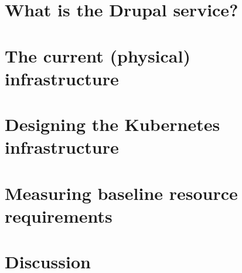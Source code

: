 \documentclass{webofc}
\begin{document}
\section{What is the Drupal service?}
\label{sec-drupalsvc}


\section{The current (physical) infrastructure}
\label{sec-phys-infra}


\section{Designing the Kubernetes infrastructure}
\label{sec-k8s-design}


\section{Measuring baseline resource requirements}
\label{sec-experiment}


\section{Discussion}
\label{sec-discussion}



\end{document}
